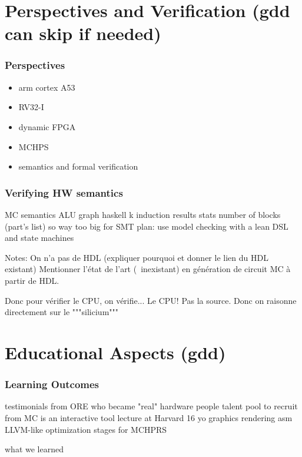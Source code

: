 \documentclass[aspectratio=169]{beamer}
\begin{document}
\section{Perspectives and Verification (gdd can skip if needed)}
\begin{frame}
	\frametitle{Perspectives}
	\begin{itemize}
		\item arm cortex A53
		\item RV32-I
		\item dynamic FPGA
		\item MCHPS
		\item semantics and formal verification
	\end{itemize}
\end{frame}

\begin{frame}
	\frametitle{Verifying HW semantics}
	MC semantics
	ALU graph
	haskell k induction
	results
	stats number of blocks (part's list)
	so way too big for SMT
	plan: use model checking with a lean DSL and state machines



	Notes: On n'a pas de HDL (expliquer pourquoi et donner le lien du HDL existant)
	Mentionner l'état de l'art (~inexistant) en génération de circuit MC à
	partir de HDL.

	Donc pour vérifier le CPU, on vérifie... Le CPU! Pas la source.
	Donc on raisonne directement sur le """silicium"""
\end{frame}

\section{Educational Aspects (gdd)}

\begin{frame}
	\frametitle{Learning Outcomes}
	testimonials from ORE who became "real" hardware people
	talent pool to recruit from
	MC is an interactive tool
	lecture at Harvard
	16 yo
	graphics rendering
	asm
	LLVM-like optimization stages for MCHPRS

	what we learned
\end{frame}
\end{document}
